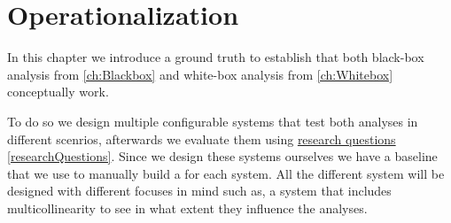 \chapter{Operationalization}\label{ch:operationalization}
In this chapter we introduce a ground truth to establish that both black-box analysis from \autoref{ch:Blackbox} and white-box analysis from 
\autoref{ch:Whitebox} conceptually work. 

To do so we design multiple configurable systems that test both analyses in different scenrios, afterwards we evaluate
them using \hyperref[researchQuestions]{research questions \ref*{researchQuestions}}. Since we design these systems ourselves we have 
a baseline that we use to manually build a \perfInfluenceModel for each system. All the different system will be designed with different focuses in mind
such as, a system that includes multicollinearity to see in what extent they influence the analyses.



